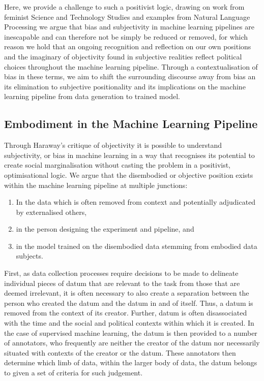 Here, we provide a challenge to such a positivist logic, drawing on work from feminist Science and Technology Studies and examples from Natural Language Processing we argue that bias and subjectivity in machine learning pipelines are inescapable and can therefore not be simply be reduced or removed, for which reason we hold that an ongoing recognition and reflection on our own positions and the imaginary of objectivity found in subjective realities reflect political choices throughout the machine learning pipeline. Through a contextualisation of bias in these terms, we aim to shift the surrounding discourse away from bias an its elimination to subjective positionality and its implications on the machine learning pipeline from data generation to trained model.

\subsection{Embodiment in the Machine Learning Pipeline}
Through Haraway's \citet{Haraway:1988} critique of objectivity it is possible to understand subjectivity, or bias in machine learning in a way that recognises its potential to create social marginalisation without casting the problem in a positivist, optimisational logic. We argue that the disembodied or objective position exists within the machine learning pipeline at multiple junctions:
\begin{enumerate}
  \item{In the data which is often removed from context and potentially adjudicated by externalised others,}
  \item{in the person designing the experiment and pipeline, and}
  \item{in the model trained on the disembodied data stemming from embodied data subjects.}
\end{enumerate}
First, as data collection processes require decisions to be made to delineate individual pieces of datum that are relevant to the task from those that are deemed irrelevant, it is often necessary to also create a separation between the person who created the datum and the datum in and of itself. Thus, a datum is removed from the context of its creator. Further, datum is often disassociated with the time and the social and political contexts within which it is created. In the case of supervised machine learning, the datum is then provided to a number of annotators, who frequently are neither the creator of the datum nor necessarily situated with contexts of the creator or the datum. These annotators then determine which limb of data, within the larger body of data, the datum belongs to given a set of criteria for such judgement.

